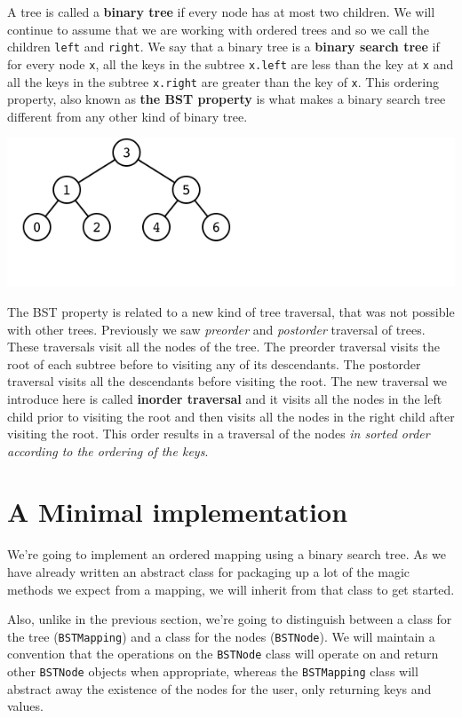 A tree is called a \textbf{binary tree} if every node has at most two children.
We will continue to assume that we are working with ordered trees and so we call the children \texttt{left} and \texttt{right}.
We say that a binary tree is a \textbf{binary search tree} if for every node \texttt{x}, all the keys in the subtree \texttt{x.left} are less than the key at \texttt{x} and all the keys in the subtree \texttt{x.right} are greater than the key of \texttt{x}.  This ordering property, also known as \textbf{the BST property} is what makes a binary search tree different from any other kind of binary tree.


\includegraphics[width=\textwidth]{./figures/bst_example.png}


The BST property is related to a new kind of tree traversal, that was not possible with other trees.
Previously we saw \emph{preorder} and \emph{postorder} traversal of trees.
These traversals visit all the nodes of the tree.
The preorder traversal visits the root of each subtree before to visiting any of its descendants.
The postorder traversal visits all the descendants before visiting the root.
The new traversal we introduce here is called \textbf{inorder traversal} and it visits all the nodes in the left child prior to visiting the root and then visits all the nodes in the right child after visiting the root.
This order results in a traversal of the nodes \emph{in sorted order according to the ordering of the keys}.

\section{A Minimal implementation}


We're going to implement an ordered mapping using a binary search tree.
As we have already written an abstract class for packaging up a lot of the magic methods we expect from a mapping, we will inherit from that class to get started.  


Also, unlike in the previous section, we're going to distinguish between a class for the tree (\texttt{BSTMapping}) and a class for the nodes (\texttt{BSTNode}).
We will maintain a convention that the operations on the \texttt{BSTNode} class will operate on and return other \texttt{BSTNode} objects when appropriate, whereas the \texttt{BSTMapping} class will abstract away the existence of the nodes for the user, only returning keys and values.


